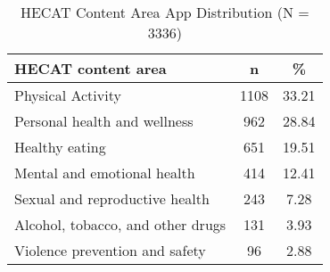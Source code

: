 \begin{table}[!htb]
    \center
    \begin{tabular}{l | c | c}
        \textbf{HECAT content area} & \textbf{n} & \textbf{\%}\footnotemark \\
        \hline
        Physical Activity & 1108 & 33.21 \\
        \hline
        Personal health and wellness & 962 & 28.84 \\
        \hline
        Healthy eating & 651 & 19.51 \\
        \hline
        Mental and emotional health & 414 & 12.41 \\
        \hline
        Sexual and reproductive health & 243 & 7.28 \\
        \hline
        Alcohol, tobacco, and other drugs & 131 & 3.93 \\
        \hline
        Violence prevention and safety & 96 & 2.88 \\
    \end{tabular}
    \caption[HECAT Content Area App Distribution]{HECAT Content Area App Distribution (N = 3336)\footnotemark}
    \label{tab:HECAT}
\end{table}
\addtocounter{footnote}{-1}
\addtocounter{footnote}{1}

